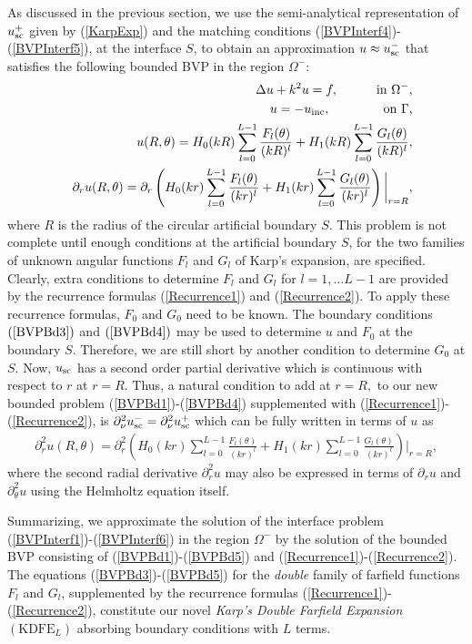 \documentclass[final,3p,times,12pt]{elsarticle}
\newcommand{\usc}{u_{\rm sc}}
\newcommand{\uinc}{u_{\rm inc}}
\newcommand{\Omm}{\Omega^{-}}
\begin{document}
 {As discussed in the previous section, we use the semi-analytical representation of $\usc^{+}$ given by (\ref{KarpExp}) and the matching conditions
 (\ref{BVPInterf4})-(\ref{BVPInterf5}), at the interface $S$, to obtain an approximation $u \approx \usc^{-}$ that satisfies the following bounded BVP in the region $\Omm$:}
 \begin{eqnarray}
&& \Delta u + k^2 u = f, \quad\qquad  \text{in $\Omega^{-}$}, \label{BVPBd1} \\
&& u = - \uinc, \qquad\qquad\,  \text{on $\Gamma$,} \label{BVPBd2} \\
&& u(R,\theta)=H_0(kR) \sum_{l=0}^{L-1} \frac{F_l(\theta)}{(kR)^l} + H_1(kR)\sum_{l=0}^{L-1} \frac{G_l(\theta)}{(kR)^l},\label{BVPBd3} \\
&&\partial_{r} u(R,\theta) = \partial_{r}\left( H_0(kr) \sum_{l=0}^{L-1} \frac{F_l(\theta)}{(kr)^l} + H_1(kr)\sum_{l=0}^{L-1} \frac{G_l(\theta)}{(kr)^l}\right) \bigg|_{r=R},\label{BVPBd4} 
\end{eqnarray}
where $R$ is the radius of the circular artificial boundary $S$. This problem is not complete until enough conditions at the artificial boundary $S$, for the two families of unknown angular functions $F_l$ and $G_l$ of Karp's expansion, are specified. Clearly, extra conditions to determine $F_l$ and $G_l$ for $l=1,\dots L-1$ are provided by the recurrence formulas (\ref{Recurrence1}) and (\ref{Recurrence2}). To apply these recurrence formulas, $F_0$ and $G_0$ need to be known.  {The boundary conditions
$(\ref{BVPBd3})$ and $(\ref{BVPBd4})$ may be used to determine $u$ and $F_0$ at the boundary $S$. Therefore, we are still short by another condition to determine $G_0$ at $S$. 
Now, $\usc$ has a second order partial derivative which is continuous with respect to $r$ at $r=R$. Thus, a natural condition to add at $r=R,$ to our new bounded problem (\ref{BVPBd1})-(\ref{BVPBd4}) supplemented  with (\ref{Recurrence1})-(\ref{Recurrence2}), is $\partial_{\nu}^2 \usc^{-} = \partial_{\nu}^2 \usc^{+} $ which can be fully written in terms of $u$ as}
\begin{eqnarray}
\partial_{r}^2 u(R,\theta) = \partial_{r}^2\left( H_0(kr)\sum_{l=0}^{L-1} \frac{F_l(\theta)}{(kr)^l} + H_1(kr)\sum_{l=0}^{L-1} \frac{G_l(\theta)}{(kr)^l}\right) \bigg|_{r=R}, \label{BVPBd5}
\end{eqnarray}
where the second radial derivative $\partial_{r}^2 u$ may also be expressed in terms of $\partial_{r} u$ and $\partial_{\theta}^2 u$ using the Helmholtz equation itself.

 {Summarizing, we approximate the solution of the interface problem (\ref{BVPInterf1})-(\ref{BVPInterf6}) in the region $\Omega^{-}$ by the solution of the bounded BVP consisting of (\ref{BVPBd1})-(\ref{BVPBd5}) and (\ref{Recurrence1})-(\ref{Recurrence2}). The equations (\ref{BVPBd3})-(\ref{BVPBd5}) for the \textit{double} family of farfield functions $F_l$ and $G_l$, supplemented by the recurrence formulas (\ref{Recurrence1})-(\ref{Recurrence2}),  constitute our novel \textit{Karp's Double Farfield Expansion} $(\text{KDFE}_{L})$ absorbing boundary conditions with $L$ terms.}
\end{document}
